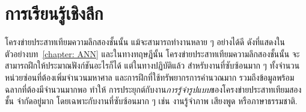 \chapter{การเรียนรู้เชิงลึก}
\label{chapter: Deep Learning}

\begin{Parallel}[c]{0.52\textwidth}{0.35\textwidth}
\end{Parallel}

\vspace{1cm}



%
%

โครงข่ายประสาทเทียมความลึกสองชั้นนั้น แม้จะสามารถทำงานหลาย ๆ อย่างได้ดี ดังที่แสดงในตัวอย่างบท~\ref{chapter: ANN}
และในทางทฤษฎีนั้น โครงข่ายประสาทเทียมความลึกสองชั้นนั้น จะสามารถฝึกให้ประมาณฟังก์ชันอะไรก็ได้\cite{Cybenko1989a, Hornik1991a}
แต่ในทางปฏิบัติแล้ว สำหรับงานที่ซับซ้อนมาก ๆ ทั้งจำนวนหน่วยซ่อนที่ต้องเพิ่มจำนวนมหาศาล
และการฝึกที่ใช้ทรัพยากรการคำนวณมาก รวมถึงข้อมูลพร้อมฉลากที่ต้องมีจำนวนมากพอ
ทำให้ การประยุกต์กับงาน\textit{การรู้จำรูปแบบ}ของโครงข่ายประสาทเทียมสองชั้น จำกัดอยู่มาก 
โดยเฉพาะกับงานที่ซับซ้อนมาก ๆ เช่น งานรู้จำภาพ เสียงพูด หรือภาษาธรรมชาติ.

